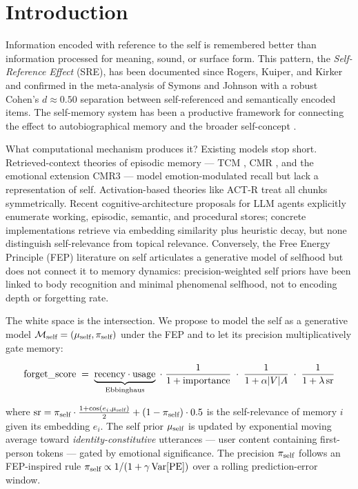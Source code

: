 \section{Introduction}
\label{sec:intro}

Information encoded with reference to the self is remembered better than
information processed for meaning, sound, or surface form. This pattern,
the \emph{Self-Reference Effect} (SRE), has been documented since
Rogers, Kuiper, and Kirker \cite{rogers1977sre} and confirmed in the
meta-analysis of Symons and Johnson \cite{symons1997meta} with a robust
Cohen's $d \approx 0.50$ separation between self-referenced and
semantically encoded items. The self-memory system has been a productive framework for connecting
the effect to autobiographical memory and the broader self-concept
\cite{conway2005smemsys}.

What computational mechanism produces it?
Existing models stop short. Retrieved-context theories of episodic
memory --- TCM \cite{howard2002tcm}, CMR \cite{polyn2009cmr}, and the
emotional extension CMR3 \cite{cohen2022cmr3} --- model emotion-modulated
recall but lack a representation of self. Activation-based theories like
ACT-R \cite{anderson2007actr} treat all chunks symmetrically.
Recent cognitive-architecture proposals for LLM agents
\cite{sumers2024cogarch} explicitly enumerate working, episodic,
semantic, and procedural stores; concrete implementations
\cite{memos2025} retrieve via embedding similarity plus heuristic
decay, but none distinguish self-relevance from topical relevance. Conversely, the Free Energy Principle (FEP) literature on
self \cite{friston2010fep,apps2014freeself,limanowski2013minimalself}
articulates a generative model of selfhood but does not connect it to
memory dynamics: precision-weighted self priors have been linked to body
recognition and minimal phenomenal selfhood, not to encoding depth or
forgetting rate.

The white space is the intersection. We propose to model the self as
a generative model $\mathcal{M}_{\text{self}} = (\mu_{\text{self}}, \pi_{\text{self}})$ under the FEP and to let
its precision multiplicatively gate memory:

\begin{equation}
\text{forget\_score}\;=\;
\underbrace{\text{recency}\cdot\text{usage}}_{\text{Ebbinghaus}}
\;\cdot\;\frac{1}{1+\text{importance}}
\;\cdot\;\frac{1}{1+\alpha|V|A}
\;\cdot\;\frac{1}{1+\lambda\,\mathrm{sr}}
\end{equation}

where $\mathrm{sr} = \pi_{\text{self}} \cdot \tfrac{1+\cos(e_i,\mu_{\text{self}})}{2}
+ (1-\pi_{\text{self}})\cdot 0.5$ is the self-relevance of memory $i$ given its
embedding $e_i$.
The self prior $\mu_{\text{self}}$ is updated by exponential moving average toward
\emph{identity-constitutive} utterances --- user content containing
first-person tokens --- gated by emotional significance. The precision
$\pi_{\text{self}}$ follows an FEP-inspired rule
$\pi_{\text{self}} \propto 1/(1+\gamma\,\mathrm{Var}[\mathrm{PE}])$ over a rolling prediction-error
window.


